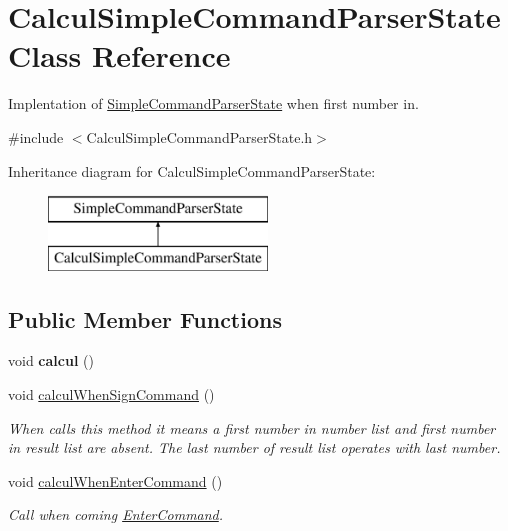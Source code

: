 \hypertarget{class_calcul_simple_command_parser_state}{}\section{Calcul\+Simple\+Command\+Parser\+State Class Reference}
\label{class_calcul_simple_command_parser_state}


Implentation of \hyperlink{class_simple_command_parser_state}{Simple\+Command\+Parser\+State} when first number in.  




{\ttfamily \#include $<$Calcul\+Simple\+Command\+Parser\+State.\+h$>$}

Inheritance diagram for Calcul\+Simple\+Command\+Parser\+State\+:\begin{figure}[H]
\begin{center}
\leavevmode
\includegraphics[height=2.000000cm]{class_calcul_simple_command_parser_state}
\end{center}
\end{figure}
\subsection*{Public Member Functions}
\begin{DoxyCompactItemize}
\item 
\hypertarget{class_calcul_simple_command_parser_state_a5f313a956db9a84e5bb3c80f47bc73da}{}void {\bfseries calcul} ()\label{class_calcul_simple_command_parser_state_a5f313a956db9a84e5bb3c80f47bc73da}

\item 
void \hyperlink{class_calcul_simple_command_parser_state_a2d8346bd6ea8fb816c4c3d80d9a9fea5}{calcul\+When\+Sign\+Command} ()
\begin{DoxyCompactList}\small\item\em When calls this method it means a first number in number list and first number in result list are absent. The last number of result list operates with last number. \end{DoxyCompactList}\item 
\hypertarget{class_calcul_simple_command_parser_state_a6530654f749837c4af5e1c36d26075bf}{}void \hyperlink{class_calcul_simple_command_parser_state_a6530654f749837c4af5e1c36d26075bf}{calcul\+When\+Enter\+Command} ()\label{class_calcul_simple_command_parser_state_a6530654f749837c4af5e1c36d26075bf}

\begin{DoxyCompactList}\small\item\em Call when coming \hyperlink{class_enter_command}{Enter\+Command}. \end{DoxyCompactList}\end{DoxyCompactItemize}


